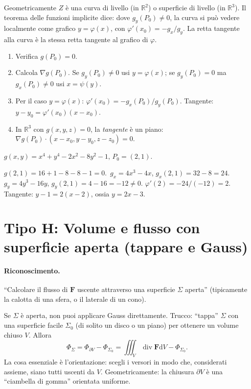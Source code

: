 \documentclass[11pt,a4paper,openany]{book}
\theoremstyle{plain}
\theoremstyle{definition}
\theoremstyle{remark}
\newcommand{\R}{\mathbb{R}}
\newcommand{\Div}{\operatorname{div}}
\newcommand{\F}{\mathbf{F}}
\newcommand{\dV}{\mathrm{d}V}
\begin{document}
\begin{nota}[title={Intuizione}]
Geometricamente $Z$ \`e una curva di livello (in $\R^2$) o
superficie di livello (in $\R^3$). Il teorema delle funzioni implicite
dice: dove $g_y(P_0)\ne 0$, la curva si pu\`o vedere localmente come
grafico $y=\varphi(x)$, con $\varphi'(x_0)=-g_x/g_y$. La retta
tangente alla curva \`e la stessa retta tangente al grafico di $\varphi$.
\end{nota}

\begin{ricetta}[title={Retta tangente per implicite}]
\begin{enumerate}
\item Verifica $g(P_0)=0$.
\item Calcola $\nabla g(P_0)$. Se $g_y(P_0)\ne 0$ usi $y=\varphi(x)$;
   se $g_y(P_0)=0$ ma $g_x(P_0)\ne 0$ usi $x=\psi(y)$.
\item Per il caso $y=\varphi(x)$:
   $\varphi'(x_0)=-g_x(P_0)/g_y(P_0)$.
   Tangente: $y-y_0=\varphi'(x_0)(x-x_0)$.
\item In $\R^3$ con $g(x,y,z)=0$, la \emph{tangente} \`e un piano:
   $\nabla g(P_0)\cdot(x-x_0,y-y_0,z-z_0)=0$.
\end{enumerate}
\end{ricetta}

\begin{esempio}[title={23/1/2023 --- Esercizio 2(iii)}]
$g(x,y)=x^4+y^4-2x^2-8y^2-1$, $P_0=(2,1)$.

$g(2,1)=16+1-8-8-1=0$.\,\checkmark
$g_x=4x^3-4x$, $g_x(2,1)=32-8=24$.
$g_y=4y^3-16y$, $g_y(2,1)=4-16=-12\ne 0$.
$\varphi'(2)=-24/(-12)=2$.
Tangente: $y-1=2(x-2)$, ossia $y=2x-3$.
\end{esempio}

\section{Tipo H: Volume e flusso con superficie aperta (tappare e Gauss)}

\paragraph{Riconoscimento.} ``Calcolare il flusso di $\F$ uscente
attraverso una superficie $\Sigma$ aperta'' (tipicamente la calotta di
una sfera, o il laterale di un cono).

\begin{nota}[title={Intuizione}]
Se $\Sigma$ \`e aperta, non puoi applicare Gauss direttamente. Trucco:
``tappa'' $\Sigma$ con una superficie facile $\Sigma_0$ (di solito un
disco o un piano) per ottenere un volume chiuso $V$. Allora
\[
\Phi_\Sigma=\Phi_{\partial V}-\Phi_{\Sigma_0}=\iiint_V\Div\F\dV-\Phi_{\Sigma_0}.
\]
La cosa essenziale \`e l'orientazione: scegli i versori in modo che,
considerati assieme, siano tutti uscenti da $V$. Geometricamente: la
chiusura $\partial V$ \`e una ``ciambella di gomma'' orientata uniforme.
\end{nota}
\end{document}

